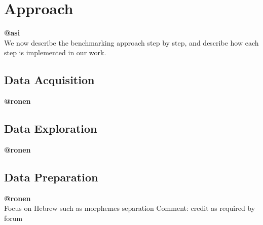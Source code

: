 \documentclass[a4paper]{article}
\begin{document}
\section{Approach}
\label{Approach}
\textbf{@asi}\\
We now describe the benchmarking approach step by step, and describe how each step is implemented in our work.
\subsection{Data Acquisition}
\textbf{@ronen}\\
\subsection{Data Exploration}
\textbf{@ronen}\\
\subsection{Data Preparation}
\textbf{@ronen}\\
Focus on Hebrew such as morphemes separation
Comment: credit as required by forum
\end{document}
